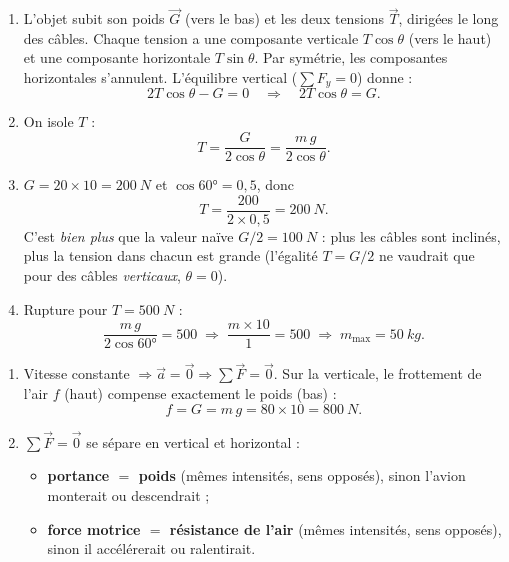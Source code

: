 \documentclass[11pt,a4paper]{article}
\newcommand{\vv}[1]{\vec{#1}}\newcommand{\ds}{\displaystyle}
\begin{document}
\begin{corrige}
\begin{enumerate}[label=\alph*)]
  \item L'objet subit son poids $\vv G$ (vers le bas) et les deux tensions $\vv T$, dirigées le long
        des câbles. Chaque tension a une composante verticale $T\cos\theta$ (vers le haut) et une
        composante horizontale $T\sin\theta$. Par symétrie, les composantes horizontales s'annulent.
        L'équilibre vertical ($\sum F_y=0$) donne :
        \[ 2T\cos\theta - G = 0 \quad\Longrightarrow\quad 2T\cos\theta = G. \]
  \item On isole $T$ :
        \[ T = \frac{G}{2\cos\theta} = \frac{m\,g}{2\cos\theta}. \]
  \item $G = 20\times 10 = \qty{200}{N}$ et $\cos\ang{60}=0{,}5$, donc
        \[ T = \frac{200}{2\times 0{,}5} = \qty{200}{N}. \]
        C'est \emph{bien plus} que la valeur naïve $G/2=\qty{100}{N}$ : plus les câbles sont inclinés,
        plus la tension dans chacun est grande (l'égalité $T=G/2$ ne vaudrait que pour des câbles
        \emph{verticaux}, $\theta=0$).
  \item Rupture pour $T=\qty{500}{N}$ :
        \[ \frac{m\,g}{2\cos\ang{60}} = 500 \;\Rightarrow\; \frac{m\times 10}{1} = 500
        \;\Rightarrow\; m_{\max} = \qty{50}{kg}. \]
\end{enumerate}
\end{corrige}

\begin{corrige}
\begin{enumerate}[label=\alph*)]
  \item Vitesse constante $\Rightarrow \vv a=\vv 0 \Rightarrow \sum\vv F=\vv 0$. Sur la verticale, le
        frottement de l'air $f$ (haut) compense exactement le poids (bas) :
        \[ f = G = m\,g = 80\times 10 = \qty{800}{N}. \]
  \item $\sum\vv F=\vv 0$ se sépare en vertical et horizontal :
        \begin{itemize}[leftmargin=1.4em,topsep=1pt,itemsep=1pt]
          \item \textbf{portance $=$ poids} (mêmes intensités, sens opposés), sinon l'avion monterait
                ou descendrait ;
          \item \textbf{force motrice $=$ résistance de l'air} (mêmes intensités, sens opposés), sinon
                il accélérerait ou ralentirait.
        \end{itemize}
\end{enumerate}
\end{corrige}
\end{document}
